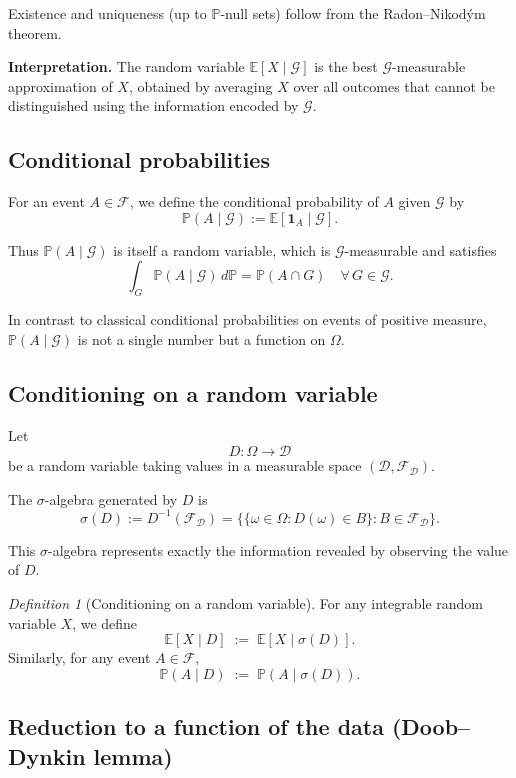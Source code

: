 \documentclass[11pt]{article}
\theoremstyle{remark}
\newtheorem{definition}{Definition}[section]
\begin{document}
Existence and uniqueness (up to $\mathbb P$-null sets) follow from the
Radon--Nikod\'ym theorem.

\medskip

\noindent
\textbf{Interpretation.}
The random variable $\mathbb E[X\mid\mathcal G]$ is the best $\mathcal G$-measurable
approximation of $X$, obtained by averaging $X$ over all outcomes that cannot be
distinguished using the information encoded by $\mathcal G$.

\subsection{Conditional probabilities}

For an event $A\in\mathcal F$, we define the conditional probability of $A$ given
$\mathcal G$ by
\[
\mathbb P(A\mid\mathcal G)
:=
\mathbb E[\mathbf 1_A\mid\mathcal G].
\]

Thus $\mathbb P(A\mid\mathcal G)$ is itself a random variable, which is
$\mathcal G$-measurable and satisfies
\[
\int_G \mathbb P(A\mid\mathcal G)\,d\mathbb P
=
\mathbb P(A\cap G)
\quad\forall\,G\in\mathcal G.
\]

In contrast to classical conditional probabilities on events of positive measure,
$\mathbb P(A\mid\mathcal G)$ is not a single number but a function on $\Omega$.

\subsection{Conditioning on a random variable}

Let
\[
D:\Omega\to\mathcal D
\]
be a random variable taking values in a measurable space
$(\mathcal D,\mathcal F_{\mathcal D})$.

The $\sigma$-algebra generated by $D$ is
\[
\sigma(D)
:=
D^{-1}(\mathcal F_{\mathcal D})
=
\{\{\omega\in\Omega: D(\omega)\in B\} : B\in\mathcal F_{\mathcal D}\}.
\]

This $\sigma$-algebra represents exactly the information revealed by observing the
value of $D$.

\begin{definition}[Conditioning on a random variable]
For any integrable random variable $X$, we define
\[
\mathbb E[X\mid D]
\;:=\;
\mathbb E[X\mid\sigma(D)].
\]
Similarly, for any event $A\in\mathcal F$,
\[
\mathbb P(A\mid D)
\;:=\;
\mathbb P(A\mid\sigma(D)).
\]
\end{definition}

\subsection{Reduction to a function of the data (Doob--Dynkin lemma)}
\end{document}
